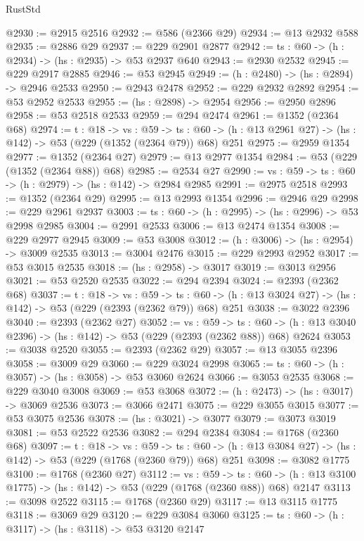 \begin{lexlean}{RustStd}
\begin{coremodule}
@2930 := @2915 @2516
@2932 := @586 (@2366 @29)
@2934 := @13 @2932 @588
@2935 := @2886 @29
@2937 := @229 @2901 @2877
@2942 := {ts : @60} -> (h : @2934) -> (hs : @2935) -> @53 @2937 @640
@2943 := @2930 @2532
@2945 := @229 @2917 @2885
@2946 := @53 @2945
@2949 := (h : @2480) -> (hs : @2894) -> @2946 @2533
@2950 := @2943 @2478
@2952 := @229 @2932 @2892
@2954 := @53 @2952 @2533
@2955 := (hs : @2898) -> @2954
@2956 := @2950 @2896
@2958 := @53 @2518 @2533
@2959 := @294 @2474
@2961 := @1352 (@2364 @68)
@2974 := {t : @18} ->
  {vs : @59} ->
  {ts : @60} -> (h : @13 @2961 @27) -> (hs : @142) -> @53 (@229 (@1352 (@2364 @79)) @68) @251
@2975 := @2959 @1354
@2977 := @1352 (@2364 @27)
@2979 := @13 @2977 @1354
@2984 := @53 (@229 (@1352 (@2364 @88)) @68)
@2985 := @2534 @27
@2990 := {vs : @59} -> {ts : @60} -> (h : @2979) -> (hs : @142) -> @2984 @2985
@2991 := @2975 @2518
@2993 := @1352 (@2364 @29)
@2995 := @13 @2993 @1354
@2996 := @2946 @29
@2998 := @229 @2961 @2937
@3003 := {ts : @60} -> (h : @2995) -> (hs : @2996) -> @53 @2998 @2985
@3004 := @2991 @2533
@3006 := @13 @2474 @1354
@3008 := @229 @2977 @2945
@3009 := @53 @3008
@3012 := (h : @3006) -> (hs : @2954) -> @3009 @2535
@3013 := @3004 @2476
@3015 := @229 @2993 @2952
@3017 := @53 @3015 @2535
@3018 := (hs : @2958) -> @3017
@3019 := @3013 @2956
@3021 := @53 @2520 @2535
@3022 := @294 @2394
@3024 := @2393 (@2362 @68)
@3037 := {t : @18} ->
  {vs : @59} ->
  {ts : @60} -> (h : @13 @3024 @27) -> (hs : @142) -> @53 (@229 (@2393 (@2362 @79)) @68) @251
@3038 := @3022 @2396
@3040 := @2393 (@2362 @27)
@3052 := {vs : @59} ->
  {ts : @60} -> (h : @13 @3040 @2396) -> (hs : @142) -> @53 (@229 (@2393 (@2362 @88)) @68) @2624
@3053 := @3038 @2520
@3055 := @2393 (@2362 @29)
@3057 := @13 @3055 @2396
@3058 := @3009 @29
@3060 := @229 @3024 @2998
@3065 := {ts : @60} -> (h : @3057) -> (hs : @3058) -> @53 @3060 @2624
@3066 := @3053 @2535
@3068 := @229 @3040 @3008
@3069 := @53 @3068
@3072 := (h : @2473) -> (hs : @3017) -> @3069 @2536
@3073 := @3066 @2471
@3075 := @229 @3055 @3015
@3077 := @53 @3075 @2536
@3078 := (hs : @3021) -> @3077
@3079 := @3073 @3019
@3081 := @53 @2522 @2536
@3082 := @294 @2384
@3084 := @1768 (@2360 @68)
@3097 := {t : @18} ->
  {vs : @59} ->
  {ts : @60} -> (h : @13 @3084 @27) -> (hs : @142) -> @53 (@229 (@1768 (@2360 @79)) @68) @251
@3098 := @3082 @1775
@3100 := @1768 (@2360 @27)
@3112 := {vs : @59} ->
  {ts : @60} -> (h : @13 @3100 @1775) -> (hs : @142) -> @53 (@229 (@1768 (@2360 @88)) @68) @2147
@3113 := @3098 @2522
@3115 := @1768 (@2360 @29)
@3117 := @13 @3115 @1775
@3118 := @3069 @29
@3120 := @229 @3084 @3060
@3125 := {ts : @60} -> (h : @3117) -> (hs : @3118) -> @53 @3120 @2147

\end{coremodule}
\end{lexlean}
